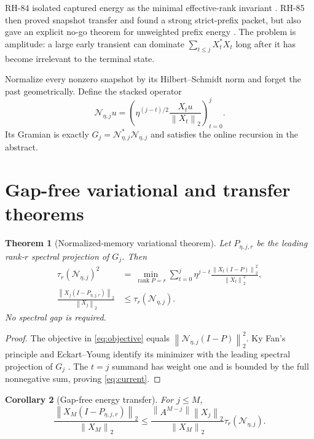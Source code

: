 \documentclass[11pt]{article}
\newtheorem{theorem}{Theorem}[section]
\newtheorem{corollary}[theorem]{Corollary}
\theoremstyle{remark}
\newcommand{\norm}[1]{\left\lVert#1\right\rVert}
\begin{document}
RH-84 isolated captured energy as the minimal effective-rank invariant
\citep{WangKyFan2026}.  RH-85 then proved snapshot transfer and found a strong
strict-prefix packet, but also gave an explicit no-go theorem for unweighted
prefix energy \citep{WangSnapshot2026}.  The problem is amplitude: a large
early transient can dominate $\sum_{t\le j}X_t^*X_t$ long after it has become
irrelevant to the terminal state.

Normalize every nonzero snapshot by its Hilbert--Schmidt norm and forget the
past geometrically.  Define the stacked operator
\[
 \mathcal N_{\eta,j}u=
 \left(\eta^{(j-t)/2}\frac{X_tu}{\norm{X_t}_2}\right)_{t=0}^j.
\]
Its Gramian is exactly $G_j=\mathcal N_{\eta,j}^*\mathcal N_{\eta,j}$ and
satisfies the online recursion in the abstract.

\section{Gap-free variational and transfer theorems}

\begin{theorem}[Normalized-memory variational theorem]
\label{thm:variational}
Let $P_{\eta,j,r}$ be the leading rank-$r$ spectral projection of $G_j$.
Then
\begin{align}
 \tau_r(\mathcal N_{\eta,j})^2
 &=\min_{\operatorname{rank}P=r}
 \sum_{t=0}^j\eta^{j-t}
 \frac{\norm{X_t(I-P)}_2^2}{\norm{X_t}_2^2},
 \label{eq:objective}\\
 \frac{\norm{X_j(I-P_{\eta,j,r})}_2}{\norm{X_j}_2}
 &\le \tau_r(\mathcal N_{\eta,j}).
 \label{eq:current}
\end{align}
No spectral gap is required.
\end{theorem}

\begin{proof}
The objective in \eqref{eq:objective} equals
$\norm{\mathcal N_{\eta,j}(I-P)}_2^2$.  Ky Fan's principle and
Eckart--Young identify its minimizer with the leading spectral projection of
$G_j$ \citep{Bhatia1997}.  The $t=j$ summand has weight one and is bounded by
the full nonnegative sum, proving \eqref{eq:current}.
\end{proof}

\begin{corollary}[Gap-free energy transfer]
\label{cor:transfer}
For $j\le M$,
\begin{equation}
 \frac{\norm{X_M(I-P_{\eta,j,r})}_2}{\norm{X_M}_2}
 \le
 \frac{\norm{A^{M-j}}\norm{X_j}_2}{\norm{X_M}_2}
 \tau_r(\mathcal N_{\eta,j}).
 \label{eq:transfer}
\end{equation}
\end{corollary}
\end{document}

